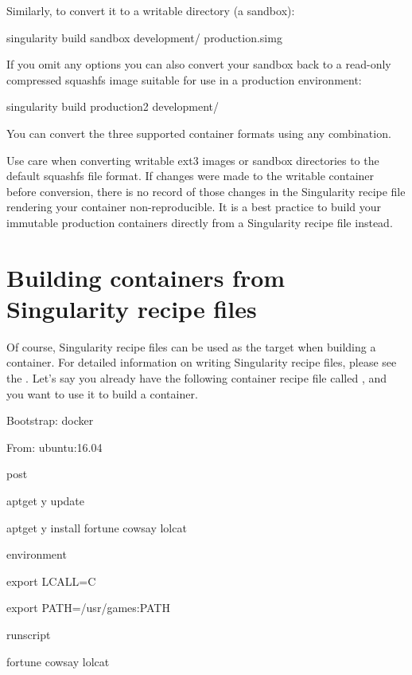 \documentclass[letterpaper,10pt,english]{sphinxmanual}
\begin{document}
Similarly, to convert it to a writable directory (a sandbox):

%
\begin{sphinxVerbatim}[commandchars=\\\{\}]
\PYGZdl{} singularity build \PYGZhy{}\PYGZhy{}sandbox development/ production.simg
\end{sphinxVerbatim}

If you omit any options you can also convert your sandbox back to a
read-only compressed squashfs image suitable for use in a production
environment:

%
\begin{sphinxVerbatim}[commandchars=\\\{\}]
\PYGZdl{} singularity build production2 development/
\end{sphinxVerbatim}

You can convert the three supported container formats using any
combination.

Use care when converting writable ext3 images or sandbox directories
to the default squashfs file format. If changes were made to the
writable container before conversion, there is no record of those
changes in the Singularity recipe file rendering your container
non-reproducible. It is a best practice to build your immutable
production containers directly from a Singularity recipe file instead.


\section{Building containers from Singularity recipe files}
\label{\detokenize{build_a_container:building-containers-from-singularity-recipe-files}}
Of course, Singularity recipe files can be used as the target when
building a container. For detailed information on writing Singularity
recipe files, please see the {\hyperref[\detokenize{container_recipes:container-recipes}]{}}.
Let’s say you already have the following container recipe file called 
, and you want to use it to build a container.

%
\begin{sphinxVerbatim}[commandchars=\\\{\}]
Bootstrap: docker

From: ubuntu:16.04


\PYGZpc{}post

    apt\PYGZhy{}get \PYGZhy{}y update

    apt\PYGZhy{}get \PYGZhy{}y install fortune cowsay lolcat


\PYGZpc{}environment

    export LC\PYGZus{}ALL=C

    export PATH=/usr/games:\PYGZdl{}PATH


\PYGZpc{}runscript

    fortune \textbar{} cowsay \textbar{} lolcat
\end{sphinxVerbatim}
\end{document}

